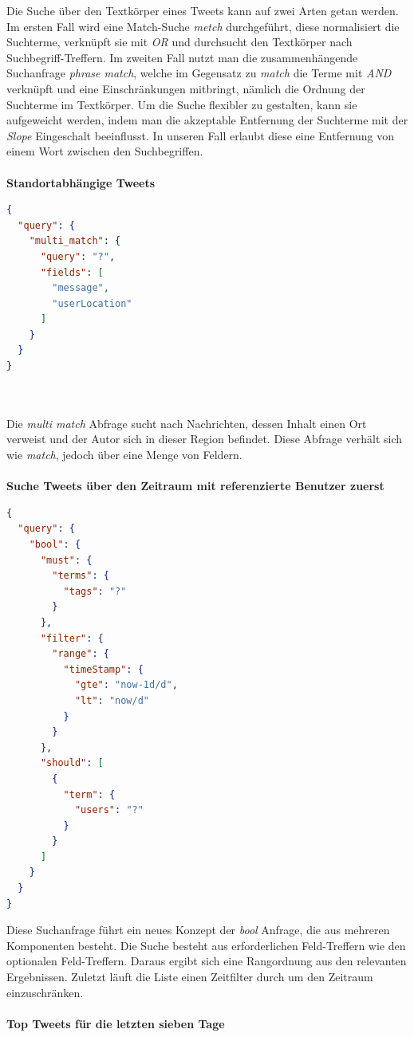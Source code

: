 Die Suche über den Textkörper eines Tweets kann auf zwei Arten getan werden. Im ersten Fall wird eine Match-Suche \textit{metch} durchgeführt, diese normalisiert die Suchterme, verknüpft sie mit \textit{OR} und durchsucht den Textkörper nach Suchbegriff-Treffern. Im zweiten Fall nutzt man die zusammenhängende Suchanfrage \textit{phrase match}, welche im Gegensatz zu \textit{match} die Terme mit \textit{AND} verknüpft und eine Einschränkungen mitbringt, nämlich die Ordnung der Suchterme im Textkörper. Um die Suche flexibler zu gestalten, kann sie aufgeweicht werden, indem man die akzeptable Entfernung der Suchterme mit der \textit{Slope} Eingeschalt beeinflusst. In unseren Fall erlaubt diese eine Entfernung von einem Wort zwischen den Suchbegriffen.
\\\\
\textbf{Standortabhängige Tweets}
 \begin{lstlisting}[language=json,firstnumber=1]
 {
  "query": {
    "multi_match": {
      "query": "?",
      "fields": [
        "message",
        "userLocation"
      ]
    }
  }
}
\end{lstlisting}
\\\\
Die \textit{multi match} Abfrage sucht nach Nachrichten, dessen Inhalt einen Ort verweist und der Autor sich in dieser Region befindet. Diese Abfrage verhält sich wie \textit{match}, jedoch über eine Menge von Feldern.
\\\\
\textbf{Suche Tweets über den Zeitraum mit referenzierte Benutzer zuerst}
 \begin{lstlisting}[language=json,firstnumber=1]
{
  "query": {
    "bool": {
      "must": {
        "terms": {
          "tags": "?"
        }
      },
      "filter": {
        "range": {
          "timeStamp": {
            "gte": "now-1d/d",
            "lt": "now/d"
          }
        }
      },
      "should": [
        {
          "term": {
            "users": "?"
          }
        }
      ]
    }
  }
}
\end{lstlisting}
Diese Suchanfrage führt ein neues Konzept der \textit{bool} Anfrage, die aus mehreren Komponenten besteht. Die Suche besteht aus erforderlichen Feld-Treffern wie den optionalen Feld-Treffern. Daraus ergibt sich eine Rangordnung aus den relevanten Ergebnissen. Zuletzt läuft die Liste einen Zeitfilter durch um den Zeitraum einzuschränken. 
\\\\
\textbf{Top Tweets für die letzten sieben Tage }
